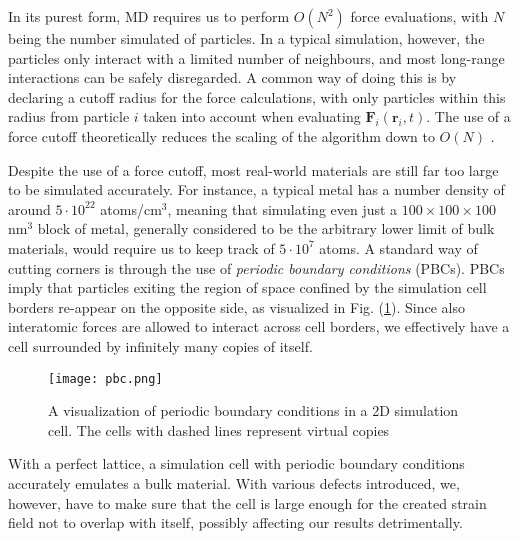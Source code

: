 In its purest form, MD requires us to perform $O(N^2)$ force evaluations, with $N$ being the number simulated of particles. 
In a typical simulation, however, the particles only interact with a limited number of neighbours, and most long-range interactions can be safely disregarded. 
A common way of doing this is by declaring a cutoff radius for the force calculations, with only particles within this radius from particle $i$ taken into account when evaluating $\mathbf{F}_i(\mathbf{r}_i,t)$. 
The use of a force cutoff theoretically reduces the scaling of the algorithm down to $O(N)$  \cite{verlet1967computer}.

Despite the use of a force cutoff, most real-world materials are still far too large to be simulated accurately.
For instance, a typical metal has a number density of around $5\cdot 10^{22}$ atoms/cm$^3$, meaning that simulating even just a $100\times 100 \times 100$ nm$^3$ block of metal, generally considered to be the arbitrary lower limit of bulk materials, would require us to keep track of $5\cdot 10^7$ atoms.
A standard way of cutting corners is through the use of \textit{periodic boundary conditions} (PBCs). 
PBCs imply that particles exiting the region of space confined by the simulation cell borders re-appear on the opposite side, as visualized in Fig. (\ref{Fig:pbcs}). 
Since also interatomic forces are allowed to interact across cell borders, we effectively have a cell surrounded by infinitely many copies of itself.

\begin{figure}[!ht]
\center
\texttt{[image: pbc.png]}
\caption{A visualization of periodic boundary conditions in a 2D simulation cell. The cells with dashed lines represent virtual copies}
\label{Fig:pbcs}
\end{figure}

With a perfect lattice, a simulation cell with periodic boundary conditions accurately emulates a bulk material. 
With various defects introduced, we, however, have to make sure that the cell is large enough for the created strain field not to overlap with itself, possibly affecting our results detrimentally.

